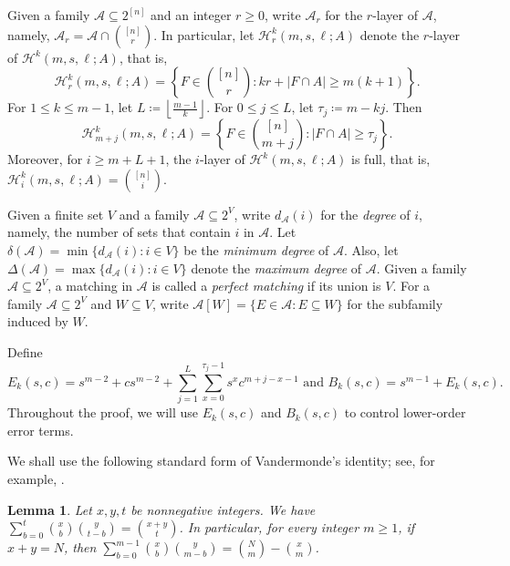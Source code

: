 \documentclass[10pt,a4paper]{article}
\numberwithin{equation}{section}
\newtheorem{lemma}[lemma]{Lemma}
\theoremstyle{definition}
\begin{document}
Given a family $\mathcal A\subseteq 2^{[n]}$ and an integer $r\ge0$, write $\mathcal A_r$ for the $r$-layer of $\mathcal A$, namely, $\mathcal A_r=\mathcal A\cap \binom{[n]}{r}$.
In particular, let $\mathcal H^k_r(m,s,\ell;A)$ denote the
$r$-layer of $\mathcal H^k(m,s,\ell;A)$, that is,
\begin{equation}\label{eq:actual-layer-def}
        \mathcal H^k_r(m,s,\ell;A)=
        \left\{F\in\binom{[n]}r:kr+|F\cap A|\ge m(k+1) \right\}.
\end{equation}
For $1\le k\le m-1$, let $L\coloneqq\left\lfloor\frac{m-1}{k}\right\rfloor$.
For $0\le j\le L$, let $\tau_j\coloneqq m-kj$. Then
\[
        \mathcal H^k_{m+j}(m,s,\ell;A)
        =
        \left\{F\in\binom{[n]}{m+j}\colon |F\cap A|\ge\tau_j\right\}.
\]
Moreover, for $i\ge m+L+1$, the $i$-layer of
$\mathcal H^k(m,s,\ell;A)$ is full, that is,
$\mathcal H^k_i(m,s,\ell;A)=\binom{[n]}i$.


Given a finite set $V$ and a family $\mathcal A\subseteq2^V$, write $d_{\mathcal A}(i)$ for the {\it degree} of $i$, namely, the number of sets that contain $i$ in $\mathcal A$.
Let $\delta(\mathcal A)=\min\{d_{\mathcal A}(i)\colon i\in V\}$ be the \emph{minimum degree} of $\mathcal A$.
Also, let $\Delta(\mathcal A)=\max\{d_{\mathcal A}(i)\colon i\in V\}$ denote the \emph{maximum degree} of $\mathcal A$.
Given a family $\mathcal A\subseteq2^V$, a matching in $\mathcal A$ is called a \emph{perfect matching} if its union is $V$.
For a family $\mathcal A\subseteq2^V$ and $W\subseteq V$, write $\mathcal A[W]=\{E\in\mathcal A:E\subseteq W\}$ for the subfamily induced by $W$.

Define
\begin{equation}\label{eq:defect-proof-E-B}
        E_k(s,c)=s^{m-2}+cs^{m-2}+
        \sum_{j=1}^{L}\sum_{x=0}^{\tau_j-1}s^x c^{m+j-x-1} \text{ and }
        B_k(s,c)=s^{m-1}+E_k(s,c).
\end{equation}
Throughout the proof, we will use $E_k(s,c)$ and $B_k(s,c)$ to control lower-order error terms.

We shall use the following standard form of Vandermonde's identity; see, for example, \cite{StanleyEC1}.

\begin{lemma}\label{lem:vandermonde}
        Let $x,y,t$ be nonnegative integers.
        We have $\sum_{b=0}^{t}\binom xb\binom y{t-b} = \binom{x+y}{t}$.
        In particular, for every integer $m\ge1$, if $x+y=N$, then $\sum_{b=0}^{m-1}\binom xb\binom y{m-b} = \binom Nm-\binom xm$.
\end{lemma}
\end{document}
